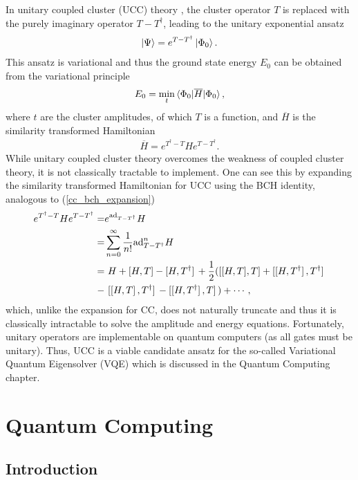 \documentclass[10pt]{article}
\begin{document}
In unitary coupled cluster (UCC) theory \cite{ref:ucc}, the cluster operator $T$ is replaced with the purely imaginary operator $T-T^\dagger$, leading to the unitary exponential ansatz
\begin{align}
\ket{\Psi}=e^{T-T^\dagger}\ket{\Phi_0}
.\end{align}
This ansatz is variational and thus the ground state energy $E_0$ can be obtained from the variational principle
\begin{align}
E_0=\underset{t}{\min}\mel{\Phi_0}{\overline{H}}{\Phi_0}
,\end{align}
where $t$ are the cluster amplitudes, of which $T$ is a function, and $\overline{H}$ is the similarity transformed Hamiltonian
\begin{align}
\overline{H}= e^{T^\dagger-T}He^{T-T^{\dagger}}
.\end{align}
While unitary coupled cluster theory overcomes the weakness of coupled cluster theory, it is not classically tractable to implement. One can see this by expanding the similarity transformed Hamiltonian for UCC using the BCH identity, analogous to (\ref{cc_bch_expansion})
\begin{align}
e^{T^\dagger-T}He^{T-T^\dagger}
=&
e^{\text{ad}_{T-T^\dagger}}H
\\
=&
\sum_{n=0}^\infty\frac{1}{n!}\text{ad}^n_{T-T^\dagger}H
\nonumber
\\
=&
\label{ucc_bch_expansion}
\ H+\comm{H}{T}-\comm*{H}{T^\dagger}+\frac{1}{2}(\comm{\comm{H}{T}}{T}+\comm*{\comm*{H}{T^\dagger}}{T^\dagger}
\nonumber
\\
-& \ \comm*{\comm*{H}{T}}{T^\dagger} - \comm*{\comm*{H}{T^\dagger}}{T})+\cdots
,\end{align}
which, unlike the expansion for CC, does not naturally truncate and thus it is classically intractable to solve the amplitude and energy equations. Fortunately, unitary operators are implementable on quantum computers (as all gates must be unitary). Thus, UCC is a viable candidate ansatz for the so-called Variational Quantum Eigensolver (VQE) which is discussed in the Quantum Computing chapter.


\chapter{Quantum Computing}

\section{Introduction}
\end{document}
